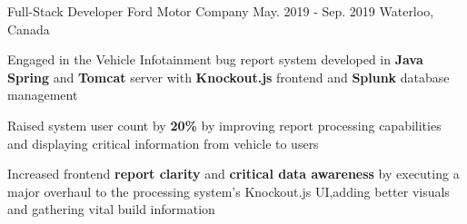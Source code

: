 \begin{cventries}
  \cventry
    {Full-Stack Developer} %
    {Ford Motor Company} %
    {May. 2019 - Sep. 2019} %
    {Waterloo, Canada} %
    {
      \begin{cvitems} %
        \item {Engaged in the Vehicle Infotainment bug report system developed in \textbf{Java Spring} and \textbf{Tomcat} server with \textbf{Knockout.js} frontend and \textbf{Splunk} database management}
        \item {Raised system user count by \textbf{20\%} by improving report processing capabilities and displaying critical information from vehicle to users}
        \item {Increased frontend \textbf{report clarity} and \textbf{critical data awareness} by executing a major overhaul to the processing system's Knockout.js UI,adding better visuals and gathering vital build information}
      \end{cvitems}
    }

\end{cventries}
